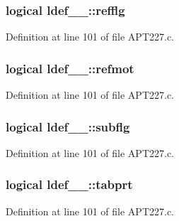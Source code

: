 \subsubsection[{\texorpdfstring{refflg}{refflg}}]{\setlength{\rightskip}{0pt plus 5cm}logical ldef\+\_\+\_\+\+::refflg}\hypertarget{structldef__1___a1bcd3bdbab8897c519d3cb6aa275df9c}{}\label{structldef__1___a1bcd3bdbab8897c519d3cb6aa275df9c}


Definition at line 101 of file A\+P\+T227.\+c.

\subsubsection[{\texorpdfstring{refmot}{refmot}}]{\setlength{\rightskip}{0pt plus 5cm}logical ldef\+\_\+\_\+\+::refmot}\hypertarget{structldef__1___a7a8635d7699644098793f3996e1c482b}{}\label{structldef__1___a7a8635d7699644098793f3996e1c482b}


Definition at line 101 of file A\+P\+T227.\+c.

\subsubsection[{\texorpdfstring{subflg}{subflg}}]{\setlength{\rightskip}{0pt plus 5cm}logical ldef\+\_\+\_\+\+::subflg}\hypertarget{structldef__1___a921600502ee0b2c004b7a63a54212194}{}\label{structldef__1___a921600502ee0b2c004b7a63a54212194}


Definition at line 101 of file A\+P\+T227.\+c.

\subsubsection[{\texorpdfstring{tabprt}{tabprt}}]{\setlength{\rightskip}{0pt plus 5cm}logical ldef\+\_\+\_\+\+::tabprt}\hypertarget{structldef__1___a76edec6175d7b1adfc49d8a479e3b5c2}{}\label{structldef__1___a76edec6175d7b1adfc49d8a479e3b5c2}


Definition at line 101 of file A\+P\+T227.\+c.

